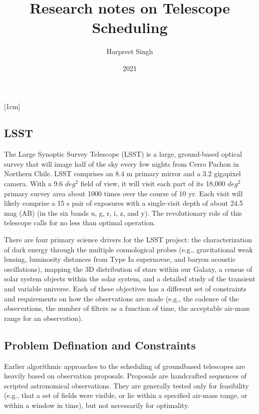\documentclass{article}
\title{Research notes on Telescope Scheduling}
\author{Harpreet Singh}
\date{2021}
\begin{document}
\maketitle


\section*{}

[1cm]

\subsection*{LSST}

The Large Synoptic Survey Telescope (LSST) is a large,
ground-based optical survey that will image half of the sky
every few nights from Cerro Pachon in Northern Chile. LSST
comprises an 8.4 m primary mirror and a 3.2 gigapixel camera.
With a 9.6 \(deg^2\) field of view, it will visit each part of its
18,000 \(deg^2\) primary survey area about 1000 times over the
course of 10 yr. Each visit will likely comprise a 15 s pair of
exposures with a single-visit depth of about 24.5 mag (AB)
(in the six bands u, g, r, i, z, and y). The revolutionary role of
this telescope calls for no less than optimal operation.

There are four primary science drivers for the LSST project:
the characterization of dark energy through the multiple
cosmological probes (e.g., gravitational weak lensing, luminosity distances from Type Ia supernovae, and baryon acoustic
oscillations), mapping the 3D distribution of stars within our
Galaxy, a census of solar system objects within the solar
system, and a detailed study of the transient and variable
universe. Each of these objectives has a different set of
constraints and requirements on how the observations are made
(e.g., the cadence of the observations, the number of filters as a
function of time, the acceptable air-mass range for an
observation). 

\subsection*{Problem Defination and Constraints}


Earlier algorithmic approaches to the scheduling of groundbased telescopes 
are heavily based on observation proposals.
Proposals are handcrafted sequences of scripted astronomical
observations. They are generally tested only for feasibility
(e.g., that a set of fields were visible, or lie within a specified
air-mass range, or within a window in time), but not necessarily
for optimality.
\end{document}
